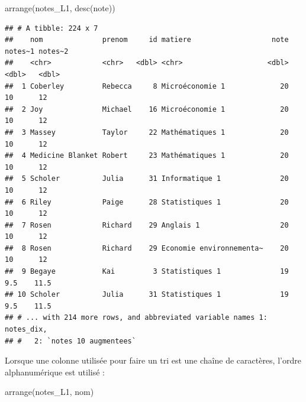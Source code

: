 \documentclass[
  11pt,
]{book}
\newenvironment{Shaded}{\begin{snugshade}}{\end{snugshade}}
\newcommand{\FunctionTok}[1]{\textcolor[rgb]{0.00,0.00,0.00}{#1}}
\newcommand{\NormalTok}[1]{#1}
\numberwithin{equation}{section}
\numberwithin{countremarque}{section}
\begin{document}
\begin{Shaded}
\begin{Highlighting}[]
\FunctionTok{arrange}\NormalTok{(notes\_L1, }\FunctionTok{desc}\NormalTok{(note))}
\end{Highlighting}
\end{Shaded}

\begin{lstlisting}
## # A tibble: 224 x 7
##    nom              prenom     id matiere                   note notes~1 notes~2
##    <chr>            <chr>   <dbl> <chr>                    <dbl>   <dbl>   <dbl>
##  1 Coberley         Rebecca     8 Microéconomie 1             20    10      12  
##  2 Joy              Michael    16 Microéconomie 1             20    10      12  
##  3 Massey           Taylor     22 Mathématiques 1             20    10      12  
##  4 Medicine Blanket Robert     23 Mathématiques 1             20    10      12  
##  5 Scholer          Julia      31 Informatique 1              20    10      12  
##  6 Riley            Paige      28 Statistiques 1              20    10      12  
##  7 Rosen            Richard    29 Anglais 1                   20    10      12  
##  8 Rosen            Richard    29 Economie environnementa~    20    10      12  
##  9 Begaye           Kai         3 Statistiques 1              19     9.5    11.5
## 10 Scholer          Julia      31 Statistiques 1              19     9.5    11.5
## # ... with 214 more rows, and abbreviated variable names 1: notes_dix,
## #   2: `notes 10 augmentees`
\end{lstlisting}

Lorsque une colonne utilisée pour faire un tri est une chaîne de caractères, l'ordre alphanumérique est utilisé :

\begin{Shaded}
\begin{Highlighting}[]
\FunctionTok{arrange}\NormalTok{(notes\_L1, nom)}
\end{Highlighting}
\end{Shaded}
\end{document}
